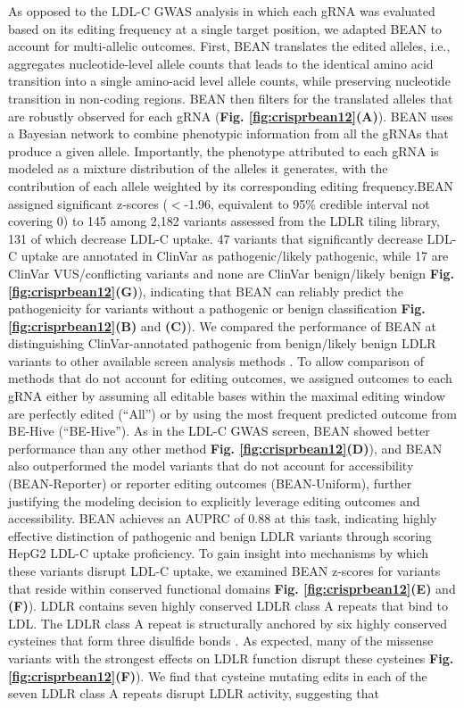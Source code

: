 \documentclass[a4paper, titlepage, openright]{book}
\begin{document}
As opposed to the LDL-C GWAS analysis in which each gRNA was evaluated based on its editing frequency at a single target position, we adapted BEAN to account for multi-allelic outcomes. First, BEAN translates the edited alleles, i.e., aggregates nucleotide-level allele counts that leads to the identical amino acid transition into a single amino-acid level allele counts, while preserving nucleotide transition in non-coding regions. BEAN then filters for the translated alleles that are robustly observed for each gRNA (\textbf{Fig. \ref{fig:crisprbean12}(A)}). BEAN uses a Bayesian network to combine phenotypic information from all the gRNAs that produce a given allele. Importantly, the phenotype attributed to each gRNA is modeled as a mixture distribution of the alleles it generates, with the contribution of each allele weighted by its corresponding editing frequency.BEAN assigned significant z-scores ($<$-1.96, equivalent to 95\% credible interval not covering 0) to 145 among 2,182 variants assessed from the LDLR tiling library, 131 of which decrease LDL-C uptake. 47 variants that significantly decrease LDL-C uptake are annotated in ClinVar as pathogenic/likely pathogenic, while 17 are ClinVar VUS/conflicting variants and none are ClinVar benign/likely benign \textbf{Fig. \ref{fig:crisprbean12}(G)}), indicating that BEAN can reliably predict the pathogenicity for variants without a pathogenic or benign classification \textbf{Fig. \ref{fig:crisprbean12}(B)} and \textbf{(C)}). We compared the performance of BEAN at distinguishing ClinVar-annotated pathogenic from benign/likely benign LDLR variants to other available screen analysis methods \citep{li2014mageck, li2015quality, jeong2019beta, daley2018crisphiermix}. To allow comparison of methods that do not account for editing outcomes, we assigned outcomes to each gRNA either by assuming all editable bases within the maximal editing window are perfectly edited \citep{hanna2021massively} (“All”) or by using the most frequent predicted outcome from BE-Hive \citep{arbab2020determinants}(“BE-Hive”). As in the LDL-C GWAS screen, BEAN showed better performance than any other method \textbf{Fig. \ref{fig:crisprbean12}(D)}), and BEAN also outperformed the model variants that do not account for accessibility (BEAN-Reporter) or reporter editing outcomes (BEAN-Uniform), further justifying the modeling decision to explicitly leverage editing outcomes and accessibility. BEAN achieves an AUPRC of 0.88 at this task, indicating highly effective distinction of pathogenic and benign LDLR variants through scoring HepG2 LDL-C uptake proficiency. To gain insight into mechanisms by which these variants disrupt LDL-C uptake, we examined BEAN z-scores for variants that reside within conserved functional domains \textbf{Fig. \ref{fig:crisprbean12}(E)} and \textbf{(F)}). LDLR contains seven highly conserved LDLR class A repeats that bind to LDL. The LDLR class A repeat is structurally anchored by six highly conserved cysteines that form three disulfide bonds \citep{fass1997molecular}. As expected, many of the missense variants with the strongest effects on LDLR function disrupt these cysteines \textbf{Fig. \ref{fig:crisprbean12}(F)}). We find that cysteine mutating edits in each of the seven LDLR class A repeats disrupt LDLR activity, suggesting that 
\end{document}
